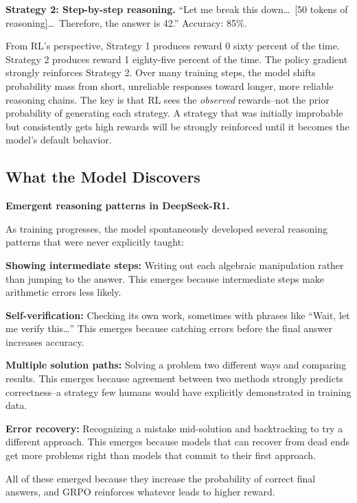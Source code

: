 \begin{chapterenv}
\textbf{Strategy 2: Step-by-step reasoning.} ``Let me break this down\ldots\ [50 tokens of reasoning]\ldots\ Therefore, the answer is 42.'' Accuracy: 85\%.

From RL's perspective, Strategy 1 produces reward 0 sixty percent of the time. Strategy 2 produces reward 1 eighty-five percent of the time. The policy gradient strongly reinforces Strategy 2. Over many training steps, the model shifts probability mass from short, unreliable responses toward longer, more reliable reasoning chains. The key is that RL sees the \textit{observed} rewards--not the prior probability of generating each strategy. A strategy that was initially improbable but consistently gets high rewards will be strongly reinforced until it becomes the model's default behavior.

\subsection{What the Model Discovers}

\begin{infobox}
\textbf{Emergent reasoning patterns in DeepSeek-R1.}

As training progresses, the model spontaneously developed several reasoning patterns that were never explicitly taught:

\textbf{Showing intermediate steps:} Writing out each algebraic manipulation rather than jumping to the answer. This emerges because intermediate steps make arithmetic errors less likely.

\textbf{Self-verification:} Checking its own work, sometimes with phrases like ``Wait, let me verify this\ldots'' This emerges because catching errors before the final answer increases accuracy.

\textbf{Multiple solution paths:} Solving a problem two different ways and comparing results. This emerges because agreement between two methods strongly predicts correctness--a strategy few humans would have explicitly demonstrated in training data.

\textbf{Error recovery:} Recognizing a mistake mid-solution and backtracking to try a different approach. This emerges because models that can recover from dead ends get more problems right than models that commit to their first approach.

All of these emerged because they increase the probability of correct final answers, and GRPO reinforces whatever leads to higher reward.
\end{infobox}


\end{chapterenv}
